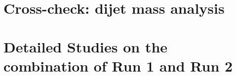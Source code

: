 \documentclass[UKenglish,texlive=2013]{\ATLASLATEXPATH atlasdoc}
\begin{document}
\section{Cross-check: dijet mass analysis}
\label{app:cutbased}

%
\clearpage

\section{Detailed Studies on the combination of Run 1 and Run 2}
\label{app:comb}




%


\clearpage

\printbibliography
%
%

\clearpage
{}

%
%
\end{document}
